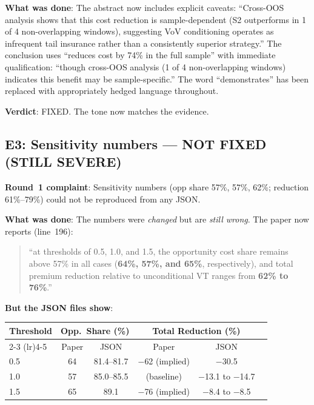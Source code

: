 \documentclass[12pt,a4paper]{article}
\begin{document}
\textbf{What was done}: The abstract now includes explicit caveats: ``Cross-OOS analysis shows that this cost reduction is sample-dependent (S2 outperforms in 1 of 4 non-overlapping windows), suggesting VoV conditioning operates as infrequent tail insurance rather than a consistently superior strategy.'' The conclusion uses ``reduces cost by 74\% in the full sample'' with immediate qualification: ``though cross-OOS analysis (1 of 4 non-overlapping windows) indicates this benefit may be sample-specific.'' The word ``demonstrates'' has been replaced with appropriately hedged language throughout.

\textbf{Verdict}: \textcolor{okgreen}{FIXED.} The tone now matches the evidence.

\bigskip

\subsection*{\textcolor{errorred}{E3: Sensitivity numbers --- NOT FIXED (STILL SEVERE)}}

\textbf{Round~1 complaint}: Sensitivity numbers (opp share 57\%, 57\%, 62\%; reduction 61\%--79\%) could not be reproduced from any JSON.

\textbf{What was done}: The numbers were \emph{changed} but are \emph{still wrong}. The paper now reports (line~196):
\begin{quote}
``at thresholds of 0.5, 1.0, and 1.5, the opportunity cost share remains above 57\% in all cases (\textbf{64\%, 57\%, and 65\%}, respectively), and total premium reduction relative to unconditional VT ranges from \textbf{62\% to 76\%}.''
\end{quote}

\textbf{But the JSON files show}:

\begin{center}
\begin{tabular}{lccccc}
\toprule
Threshold & \multicolumn{2}{c}{Opp.\ Share (\%)} & \multicolumn{2}{c}{Total Reduction (\%)} \\
\cmidrule(lr){2-3} \cmidrule(lr){4-5}
& Paper & JSON & Paper & JSON \\
\midrule
0.5 & 64 & \textcolor{errorred}{81.4--81.7} & $-$62 (implied) & \textcolor{errorred}{$-$30.5} \\
1.0 & 57 & \textcolor{errorred}{85.0--85.5} & (baseline) & \textcolor{errorred}{$-$13.1 to $-$14.7} \\
1.5 & 65 & \textcolor{errorred}{89.1} & $-$76 (implied) & \textcolor{errorred}{$-$8.4 to $-$8.5} \\
\bottomrule
\end{tabular}
\end{center}
\end{document}
